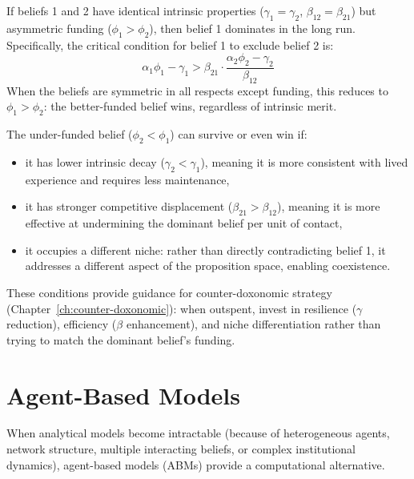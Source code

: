 \begin{proposition}
\label{prop:funding-advantage}
If beliefs 1 and 2 have identical intrinsic properties ($\gamma_1 = \gamma_2$, $\beta_{12} = \beta_{21}$) but asymmetric funding ($\phi_1 > \phi_2$), then belief 1 dominates in the long run.
Specifically, the critical condition for belief 1 to exclude belief 2 is:
\[
  \alpha_1\phi_1 - \gamma_1 > \beta_{21} \cdot \frac{\alpha_2\phi_2 - \gamma_2}{\beta_{12}}
\]
When the beliefs are symmetric in all respects except funding, this reduces to $\phi_1 > \phi_2$: the better-funded belief wins, regardless of intrinsic merit.
\end{proposition}

\begin{remark}
\label{rem:underfunded-survival}
The under-funded belief ($\phi_2 < \phi_1$) can survive or even win if:
\begin{itemize}[nosep]
  \item it has lower intrinsic decay ($\gamma_2 < \gamma_1$), meaning it is more consistent with lived experience and requires less maintenance,
  \item it has stronger competitive displacement ($\beta_{21} > \beta_{12}$), meaning it is more effective at undermining the dominant belief per unit of contact,
  \item it occupies a different niche: rather than directly contradicting belief 1, it addresses a different aspect of the proposition space, enabling coexistence.
\end{itemize}
These conditions provide guidance for counter-doxonomic strategy (Chapter~\ref{ch:counter-doxonomic}): when outspent, invest in resilience ($\gamma$ reduction), efficiency ($\beta$ enhancement), and niche differentiation rather than trying to match the dominant belief's funding.
\end{remark}


\section{Agent-Based Models}
\label{sec:ch11-abm}

When analytical models become intractable (because of heterogeneous agents, network structure, multiple interacting beliefs, or complex institutional dynamics), agent-based models (ABMs) provide a computational alternative.

